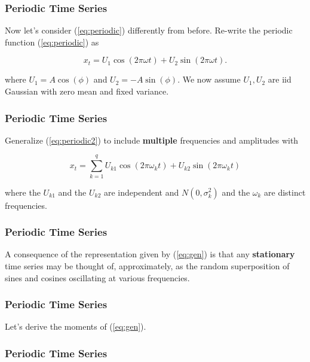 \documentclass[%
xcolor=pdftex]{beamer}
\begin{document}
\begin{frame}
\frametitle{Periodic Time Series}

Now let's consider (\ref{eq:periodic}) differently from before. Re-write the periodic function (\ref{eq:periodic}) as

\begin{equation} \label{eq:periodic2}
x_t=U_1 \cos(2 \pi \omega t)+U_2 \sin(2 \pi \omega t).
\end{equation}

where $U_1 = A \cos(\phi)$ and $U_2 = -A \sin(\phi)$. We now assume $U_1, U_2$ are iid Gaussian with zero mean and fixed variance.

\end{frame}



\begin{frame}
\frametitle{Periodic Time Series}

Generalize (\ref{eq:periodic2}) to include \textbf{multiple} frequencies and amplitudes with

\begin{equation} \label{eq:gen}
x_t = \sum_{k=1}^{q} U_{k1} \cos(2 \pi \omega_k t) + U_{k2} \sin(2 \pi \omega_k t)
\end{equation}

where the $U_{k1}$ and the $U_{k2}$ are independent and $N(0 , \sigma_k^2)$ and the $\omega_k$ are distinct frequencies.

\end{frame}

\begin{frame}
\frametitle{Periodic Time Series}

A consequence of the representation given by (\ref{eq:gen}) is that any \textbf{stationary} time series may be thought of, approximately, as the random superposition of sines and cosines oscillating at various frequencies.

\end{frame}

\begin{frame}
\frametitle{Periodic Time Series}

Let's derive the moments of (\ref{eq:gen}).

\vspace{50mm}

\end{frame}

\begin{frame}
\frametitle{Periodic Time Series}



\end{frame}
\end{document}
